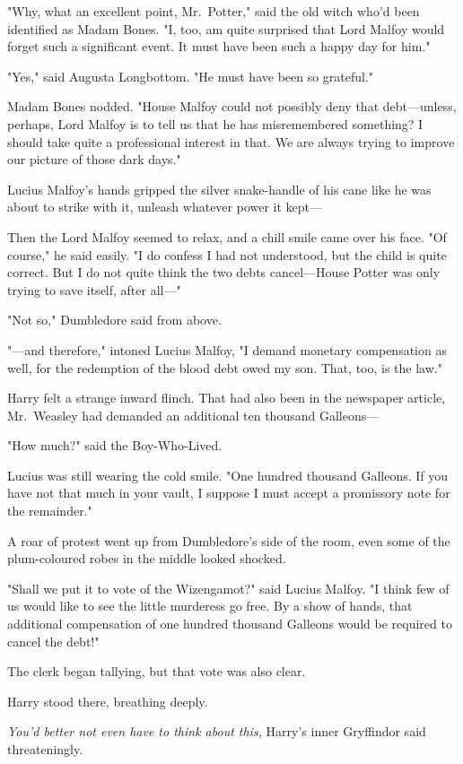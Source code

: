 "Why, what an excellent point, Mr.~Potter," said the old witch who'd been
identified as Madam Bones. "I, too, am quite surprised that Lord Malfoy would
forget such a significant event. It must have been such a happy day for him."

"Yes," said Augusta Longbottom. "He must have been so grateful."

Madam Bones nodded. "House Malfoy could not possibly deny that debt---unless,
perhaps, Lord Malfoy is to tell us that he has misremembered something? I
should take quite a professional interest in that. We are always trying to
improve our picture of those dark days."

Lucius Malfoy's hands gripped the silver snake-handle of his cane like he was
about to strike with it, unleash whatever power it kept---

Then the Lord Malfoy seemed to relax, and a chill smile came over his face. "Of
course," he said easily. "I do confess I had not understood, but the child is
quite correct. But I do not quite think the two debts cancel---House Potter was
only trying to save itself, after all---"

"Not so," Dumbledore said from above.

"---and therefore," intoned Lucius Malfoy, "I demand monetary compensation as
well, for the redemption of the blood debt owed my son. That, too, is the law."

Harry felt a strange inward flinch. That had also been in the newspaper
article, Mr.~Weasley had demanded an additional ten thousand Galleons---

"How much?" said the Boy-Who-Lived.

Lucius was still wearing the cold smile. "One hundred thousand Galleons. If you
have not that much in your vault, I suppose I must accept a promissory note for
the remainder."

A roar of protest went up from Dumbledore's side of the room, even some of the
plum-coloured robes in the middle looked shocked.

"Shall we put it to vote of the Wizengamot?" said Lucius Malfoy. "I think few
of us would like to see the little murderess go free. By a show of hands, that
additional compensation of one hundred thousand Galleons would be required to
cancel the debt!"

The clerk began tallying, but that vote was also clear.

Harry stood there, breathing deeply.

\emph{You'd better not even have to think about this,} Harry's inner Gryffindor
said threateningly.

